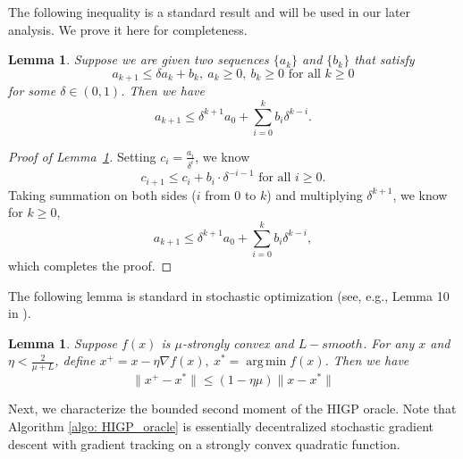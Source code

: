 \documentclass{article}
\theoremstyle{plain}
\newtheorem{lemma}[theorem]{Lemma}
\theoremstyle{definition}
\theoremstyle{remark}
\DeclareMathOperator*{\argmin}{arg\,min}
\begin{document}
The following inequality is a standard result and will be used in our later analysis. We prove it here for completeness.
\begin{lemma}\label{lem: useful_ineq}
    Suppose we are given two sequences $\{a_k\}$ and $\{b_k\}$ that satisfy
    \[
        a_{k+1}\leq \delta a_k + b_k,\ a_k\geq 0,\ b_k\geq 0 \text{ for all } k\geq 0
    \]
    for some $\delta\in (0,1)$. Then we have
    \[
        a_{k+1} \leq \delta^{k+1}a_0 + \sum_{i=0}^{k}b_i\delta^{k-i}.
    \]
\end{lemma}
\begin{proof}[Proof of Lemma~\ref{lem: useful_ineq}]
    Setting $c_i = \frac{a_i}{\delta^i}$, we know
    \[
        c_{i+1}\leq c_i + b_i\cdot\delta^{-i-1}\text{ for all }i\geq 0.
    \]
    Taking summation on both sides ($i$ from $0$ to $k$) and multiplying $\delta^{k+1}$, we know for $k\geq 0$,
    \[
        a_{k+1}\leq \delta^{k+1}a_0 + \sum_{i=0}^{k}b_i\delta^{k-i},
    \]
    which completes the proof.
\end{proof}
The following lemma is standard in stochastic optimization (see, e.g., Lemma 10 in \citet{qu2017harnessing}).
\begin{lemma}\label{lem: gd_decrease}
    Suppose $f(x)$ is $\mu$-strongly convex and $L-smooth$. For any $x$ and $\eta<\frac{2}{\mu + L}$, define $x^+ = x - \eta\nabla f(x),\ x^*=\argmin f(x)$. Then we have
    \[
        \|x^+ - x^*\| \leq (1-\eta\mu)\|x-x^*\|
    \]
\end{lemma}
Next, we characterize the bounded second moment of the HIGP oracle. Note that Algorithm \ref{algo: HIGP_oracle} is essentially decentralized stochastic gradient descent with gradient tracking on a strongly convex quadratic function.
\end{document}
